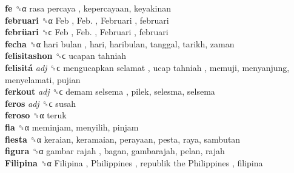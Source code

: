 \textbf{fe} ␝α   rasa percaya , kepercayaan, keyakinan  \\
\textbf{februari} ␝α   Feb ,  Feb. ,  Februari , februari  \\
\textbf{febrüari} ␝ϲ   Feb ,  Feb. ,  Februari , februari  \\
\textbf{fecha} ␝α   hari bulan , hari, haribulan, tanggal, tarikh, zaman  \\
\textbf{felisitashon} ␝ϲ   ucapan tahniah   \\
\textbf{felisitá} \emph{adj}  ␝ϲ   mengucapkan selamat ,  ucap tahniah , memuji, menyanjung, menyelamati, pujian  \\
\textbf{ferkout} \emph{adj}  ␝ϲ   demam selsema , pilek, selesma, selsema  \\
\textbf{feros} \emph{adj}  ␝ϲ  susah  \\
\textbf{feroso} ␝α  teruk  \\
\textbf{fia} ␝α  meminjam, menyilih, pinjam  \\
\textbf{fiesta} ␝α  keraian, keramaian, perayaan, pesta, raya, sambutan  \\
\textbf{figura} ␝α   gambar rajah , bagan, gambarajah, pelan, rajah  \\
\textbf{Filipina} ␝α   Filipina ,  Philippines ,  republik the Philippines , filipina  \\
